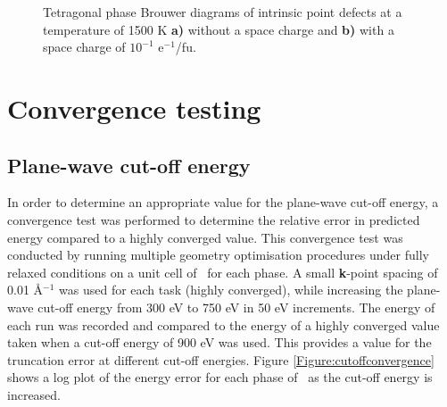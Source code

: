 \begin{figure}[htp]
\begin{center}
		\caption{Tetragonal phase Brouwer diagrams of intrinsic point defects at a temperature of 1500 K \textbf{a)} without a space charge and \textbf{b)} with a space charge of $10^{-1}$ e$^{-1}$/fu.}
		\label{figure:spacechargeexample}
	\end{center}
\end{figure}

\section{Convergence testing} \label{section:convergence}

\subsection{Plane-wave cut-off energy}

In order to determine an appropriate value for the plane-wave cut-off energy, a convergence test was performed to determine the relative error in predicted energy compared to a highly converged value. This convergence test was conducted by running multiple geometry optimisation procedures under fully relaxed conditions on a unit cell of \zirconia\ for each phase. A small \textbf{k}-point spacing of 0.01 \r{A}$^{-1}$ was used for each task (highly converged), while increasing the plane-wave cut-off energy from 300 eV to 750 eV in 50 eV increments. The energy of each run was recorded and compared to the energy of a highly converged value taken when a cut-off energy of 900 eV was used. This provides a value for the truncation error at different cut-off energies. Figure \ref{Figure:cutoffconvergence} shows a log plot of the energy error for each phase of \zirconia\ as the cut-off energy is increased. 


